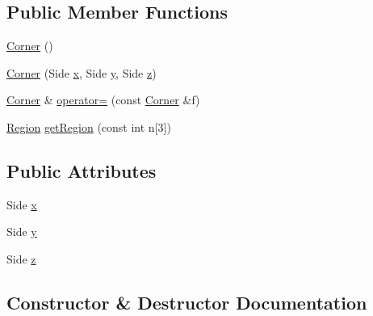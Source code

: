 \subsection*{Public Member Functions}
\begin{DoxyCompactItemize}
\item 
\hyperlink{struct_dependency_cube_m_p_i_1_1_corner_aaaca0d2df83a56574746366604e29801}{Corner} ()
\item 
\hyperlink{struct_dependency_cube_m_p_i_1_1_corner_acf350554c41d738d9f8a851e3a798e55}{Corner} (Side \hyperlink{struct_dependency_cube_m_p_i_1_1_corner_a941a0145078d057ead36939decc93c67}{x}, Side \hyperlink{struct_dependency_cube_m_p_i_1_1_corner_a76652bdcfac8ac1f4484bf56e1fe06ef}{y}, Side \hyperlink{struct_dependency_cube_m_p_i_1_1_corner_aa9cfcf5cb03be02597c5d1d07fda5e97}{z})
\item 
\hyperlink{struct_dependency_cube_m_p_i_1_1_corner}{Corner} \& \hyperlink{struct_dependency_cube_m_p_i_1_1_corner_a6df8c6c1dc0c16af393a7d71477a6b45}{operator=} (const \hyperlink{struct_dependency_cube_m_p_i_1_1_corner}{Corner} \&f)
\item 
\hyperlink{struct_region}{Region} \hyperlink{struct_dependency_cube_m_p_i_1_1_corner_a73d2edfe56f0d484ff3458758e542b30}{get\+Region} (const int n\mbox{[}3\mbox{]})
\end{DoxyCompactItemize}
\subsection*{Public Attributes}
\begin{DoxyCompactItemize}
\item 
Side \hyperlink{struct_dependency_cube_m_p_i_1_1_corner_a941a0145078d057ead36939decc93c67}{x}
\item 
Side \hyperlink{struct_dependency_cube_m_p_i_1_1_corner_a76652bdcfac8ac1f4484bf56e1fe06ef}{y}
\item 
Side \hyperlink{struct_dependency_cube_m_p_i_1_1_corner_aa9cfcf5cb03be02597c5d1d07fda5e97}{z}
\end{DoxyCompactItemize}


\subsection{Constructor \& Destructor Documentation}
\hypertarget{struct_dependency_cube_m_p_i_1_1_corner_aaaca0d2df83a56574746366604e29801}{}
